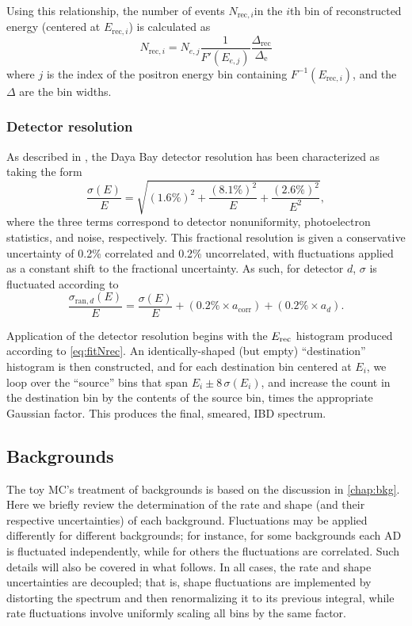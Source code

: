\documentclass[../thesis.tex]{subfiles}
\begin{document}
Using this relationship, the number of events $N_{\mathrm{rec},i}$in the $i$th bin of reconstructed energy (centered at $E_{\mathrm{rec},i}$) is calculated as
\begin{equation}
  \label{eq:fitNrec}
  N_{\mathrm{rec},i} = N_{e,j} \frac{1}{F'(E_{e,j})} \frac{\Delta_{\mathrm{rec}}}{\Delta_{\mathrm{e}}}
\end{equation}
where $j$ is the index of the positron energy bin containing $F^{-1}(E_{\mathrm{rec},i})$, and the $\Delta$ are the bin widths.

\subsubsection{Detector resolution}

As described in \cite{An_2017}, the Daya Bay detector resolution has been characterized as taking the form
\begin{equation*}
  \frac{\sigma(E)}{E} = \sqrt{(1.6\%)^2 + \frac{(8.1\%)^2}{E}
    + \frac{(2.6\%)^2}{E^2}},
\end{equation*}
where the three terms correspond to detector nonuniformity, photoelectron statistics, and noise, respectively. This fractional resolution is given a conservative uncertainty of 0.2\% correlated and 0.2\% uncorrelated, with fluctuations applied as a constant shift to the fractional uncertainty. As such, for detector $d$, $\sigma$ is fluctuated according to
\begin{equation*}
  \frac{\sigma_{\mathrm{ran},d}(E)}{E} = \frac{\sigma(E)}{E} + (0.2\% \times a_{\mathrm{corr}})  + (0.2\% \times a_d).
\end{equation*}

Application of the detector resolution begins with the $E_\mathrm{rec}$ histogram produced according to \autoref{eq:fitNrec}. An identically-shaped (but empty) ``destination'' histogram is then constructed, and for each destination bin centered at $E_i$, we loop over the ``source'' bins that span $E_i \pm 8\,\sigma(E_i)$, and increase the count in the destination bin by the contents of the source bin, times the appropriate Gaussian factor. This produces the final, smeared, IBD spectrum.

\subsection{Backgrounds}
\label{sec:fitToyBackgrounds}

The toy MC's treatment of backgrounds is based on the discussion in \autoref{chap:bkg}. Here we briefly review the determination of the rate and shape (and their respective uncertainties) of each background. Fluctuations may be applied differently for different backgrounds; for instance, for some backgrounds each AD is fluctuated independently, while for others the fluctuations are correlated. Such details will also be covered in what follows. In all cases, the rate and shape uncertainties are decoupled; that is, shape fluctuations are implemented by distorting the spectrum and then renormalizing it to its previous integral, while rate fluctuations involve uniformly scaling all bins by the same factor.
\end{document}
